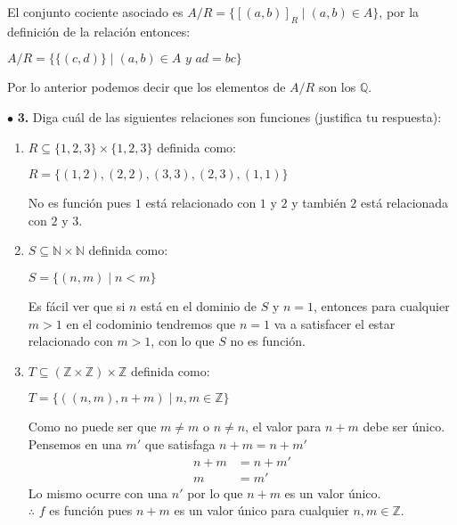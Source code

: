 \documentclass[12pt]{article}
\begin{document}
El conjunto cociente asociado es $A / R = \{[(a, b)]_R \mid (a, b) \in A\}$, por la definición  de la relación entonces:\\
\begin{center}
    $A / R = \{\{(c, d)\} \mid (a, b) \in A \textit{ y } ad = bc\}$
\end{center}
Por lo anterior podemos decir que los elementos de $A / R$ son los $\mathbb{Q}$.


\vspace{0.5cm}
%
%
$\bullet$ \textbf{3.} Diga cuál de las siguientes relaciones son funciones (justifica tu respuesta):
\begin{enumerate}[label=\alph*)]
    \item $R \subseteq \{1,2,3\} \times \{1,2,3\}$ definida como:\\
    \begin{center}
        $R = \{(1,2),(2,2),(3,3),(2,3),(1,1)\}$
    \end{center}
    No es función pues $1$ está relacionado con $1$ y $2$ y también $2$ está relacionada con $2$ y $3$.

    \item $S \subseteq \mathbb{N} \times \mathbb{N}$ definida como:\\
    \begin{center}
        $S = \{(n,m) \mid n < m\}$
    \end{center}
    Es fácil ver que si $n$ está en el dominio de $S$ y $n = 1$, entonces para cualquier $m > 1$ en el codominio tendremos que $n = 1$
    va a satisfacer el estar relacionado con $m > 1$, con lo que $S$ no es función.
    
    \item $T \subseteq ( \mathbb{Z} \times \mathbb{Z} ) \times \mathbb{Z}$ definida como:\\
    \begin{center}
        $T = \{((n,m),n+m) \mid n, m \in \mathbb{Z}\}$
    \end{center}
    Como no puede ser que $m \neq m$ o $n \neq n$, el valor para $n + m$ debe ser único.\\

    Pensemos en una $m'$ que satisfaga $n + m = n + m'$
    \begin{align*}
        n + m &= n + m'\\
        m &= m'
    \end{align*}
    Lo mismo ocurre con una $n'$ por lo que $n + m$ es un valor único.\\

    $\therefore$ $f$ es función pues $n + m$ es un valor único para cualquier $n, m \in \mathbb{Z}$.

\end{enumerate}
\end{document}
